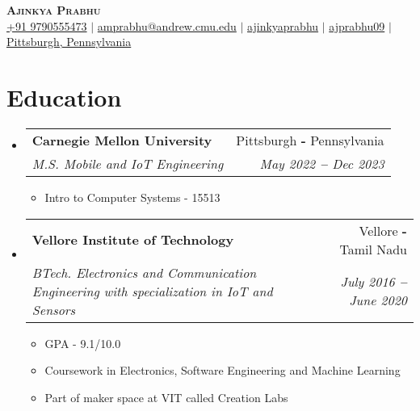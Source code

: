 \documentclass[10.5pt]{article}
\makeatletter
\newcommand{\resumeItem}[1]{
  \item\small{
    {#1 \vspace{-2pt}}
  }
}
\newcommand{\resumeSubheading}[4]{
  \vspace{-0.5pt}\item
    \begin{tabular*}{0.97\textwidth}[t]{l@{\extracolsep{\fill}}r}
      \textbf{#1} & #2 \\
      \textit{\small#3} & \textit{\small #4} \\
    \end{tabular*}\vspace{-7pt}
}
\newcommand{\resumeSubHeadingListStart}{\begin{itemize}[leftmargin=0.15in, label={}]}
\newcommand{\resumeSubHeadingListEnd}{\end{itemize}}
\newcommand{\resumeItemListStart}{\begin{itemize}}
\newcommand{\resumeItemListEnd}{\end{itemize}\vspace{-6pt}}
\makeatother
\begin{document}

\begin{flushleft}
    \textbf{\large \scshape Ajinkya Prabhu} \\ \vspace{2 pt}
    \small
    \faMobile \hspace{.5pt} \href{tel:919790555473}{+91 9790555473}
    $|$
    \faAt \hspace{.5pt} \href{mailto:amprabhu@andrew.cmu.edu}{amprabhu@andrew.cmu.edu}
    $|$
    \faLinkedinSquare \hspace{.5pt} \href{https://www.linkedin.com/in/ajinkyaprabhu/}{ajinkyaprabhu}
    $|$
    \faGithub \hspace{.5pt} \href{https://github.com/ajprabhu09}{ajprabhu09}
    $|$
    \faMapMarker \hspace{.5pt} \href{https://goo.gl/maps/nDiixFmLt41dn9vq9} {Pittsburgh, Pennsylvania}
\end{flushleft}




    
   
\section{Education}
  \vspace{-0.5pt}
    \resumeSubHeadingListStart
    \resumeSubheading
      {Carnegie Mellon University}{Pittsburgh \textbf{-} Pennsylvania}
      {M.S. Mobile and IoT Engineering}{May 2022 \textbf{--} Dec 2023}
        \resumeItemListStart
            \resumeItem{Intro to Computer Systems - 15513}
        \resumeItemListEnd
    
    \resumeSubheading
      {Vellore Institute of Technology}{Vellore \textbf{-} Tamil Nadu}
      {BTech. Electronics and Communication Engineering with specialization in IoT and Sensors}{July 2016 \textbf{--} June 2020}
        \resumeItemListStart
            \resumeItem{GPA - 9.1/10.0}
            \resumeItem{Coursework in Electronics, Software Engineering and Machine Learning}
            \resumeItem{Part of maker space at VIT called Creation Labs}
        \resumeItemListEnd
    \resumeSubHeadingListEnd
\end{document}

